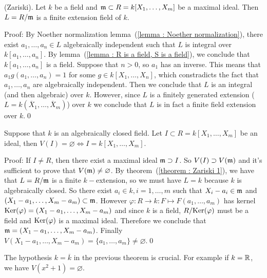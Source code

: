 \begin{dang}
    \begin{theorem}\label{theorem : Zariski 1}
        (Zariski). Let $k$ be a field and $\mathfrak{m}\subset R=k[X_1,\dots, X_m]$ be a maximal ideal. Then $L=R/\mathfrak{m}$ is 
        a finite extension field of $k$.
    \end{theorem}
\end{dang}
Proof: By Noether normalization lemma~(\ref{lemma : Noether normalization}), there exist 
$a_1,\dots, a_n\in L$ algebraically independent such that $L$ is integral over $k[a_1,\dots,a_n]$. By lemma~(\ref{lemma : R is a field, S is a field}), 
we conclude that $k[a_1,\dots,a_n]$ is a field. Suppose that $n>0$, so $a_1$ has an inverse. This means that 
$a_1g(a_1,\dots, a_n) = 1$ for some $g\in k[X_1,\dots, X_n]$, which constradicts the fact that $a_1,\dots, a_n$ are 
algebraically independent. Then we conclude that $L$ is an integral (and then algebraic) over $k$. However, since 
$L$ is a finitely generated extension ($L=k(\overline{X}_1,\dots,\overline{X}_m)$) over $k$ we conclude that $L$ is in fact 
a finite field extension over $k$.\qed

\begin{dang}
    \begin{theorem}\label{theorem : Hilbert's zero theorem}
        Suppose that $k$ is an algebraically closed field.
        Let $I\subset R =k[X_1,\dots, X_m]$ be an ideal, then $V(I)=\varnothing\iff I = k[X_1,\dots, X_m]$.
    \end{theorem}
\end{dang}
Proof: If $I\neq R$, then there exist a maximal ideal $\mathfrak{m}\supset I$. So $V(I)\supset V(\mathfrak{m})$ and it's sufficient to 
prove that $V(\mathfrak{m})\neq\varnothing$. By theorem~(\ref{theorem : Zariski 1}), we have that $L=R/\mathfrak{m}$ is a finite 
$k-$extension, so we must have $L=k$ because $k$ is algebraically closed. So there exist $a_i\in k,i=1,\dots,m$ such that 
$X_i - a_i\in\mathfrak{m}$ and $(X_1-a_1,\dots, X_m-a_m)\subset \mathfrak{m}$. However $\varphi: R\to k:F\mapsto F(a_1,\dots,a_m)$ has kernel 
$\text{Ker}(\varphi)=(X_1-a_1,\dots, X_m-a_m)$ and since $k$ is a field, $R/\text{Ker}(\varphi)$ must be  a field and 
$\text{Ker}(\varphi)$ is a maximal ideal. Therefore we conclude that $\mathfrak{m}=(X_1-a_1,\dots, X_m-a_m)$. Finally
$V(X_1-a_1,\dots,X_m-a_m)=\{a_1,\dots,a_m\}\neq\varnothing$.\qed

\begin{remark}
    The hypothesis $k=\overline{k}$ in the previous theorem is crucial. For example if $k=\mathbb{R}$, we have 
    $V(x^2+1)=\varnothing$.
\end{remark}

